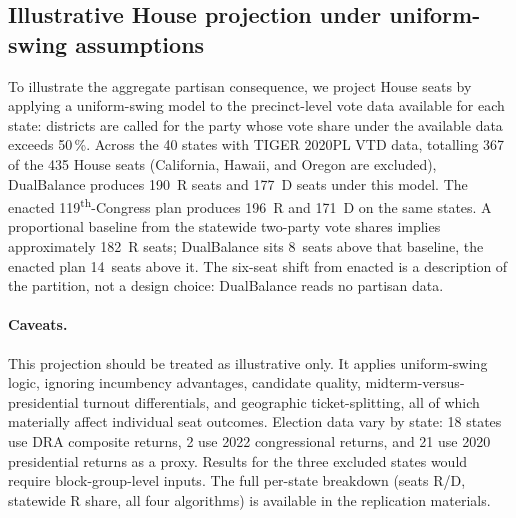 \subsection{Illustrative House projection under uniform-swing assumptions}
\label{sec:results-congress}

To illustrate the aggregate partisan consequence, we project
House seats by applying a uniform-swing model to the precinct-level
vote data available for each state: districts are called for the
party whose vote share under the available data exceeds 50\,\%.
Across the 40 states with TIGER 2020PL VTD data, totalling 367 of
the 435 House seats (California, Hawaii, and Oregon are excluded),
DualBalance produces 190~R seats and 177~D seats under this model.
The enacted 119\textsuperscript{th}-Congress plan produces 196~R
and 171~D on the same states. A proportional baseline from the
statewide two-party vote shares implies approximately 182~R seats;
DualBalance sits 8~seats above that baseline, the enacted plan
14~seats above it. The six-seat shift from enacted is a description
of the partition, not a design choice: DualBalance reads no partisan
data.

\paragraph{Caveats.}
This projection should be treated as illustrative only.
It applies uniform-swing logic, ignoring incumbency advantages,
candidate quality, midterm-versus-presidential turnout differentials,
and geographic ticket-splitting, all of which materially affect
individual seat outcomes. Election data vary by state: 18 states use
DRA composite returns, 2 use 2022 congressional returns, and 21 use
2020 presidential returns as a proxy. Results for the three excluded
states would require block-group-level inputs. The full per-state
breakdown (seats R/D, statewide R share, all four algorithms)
is available in the replication materials.
